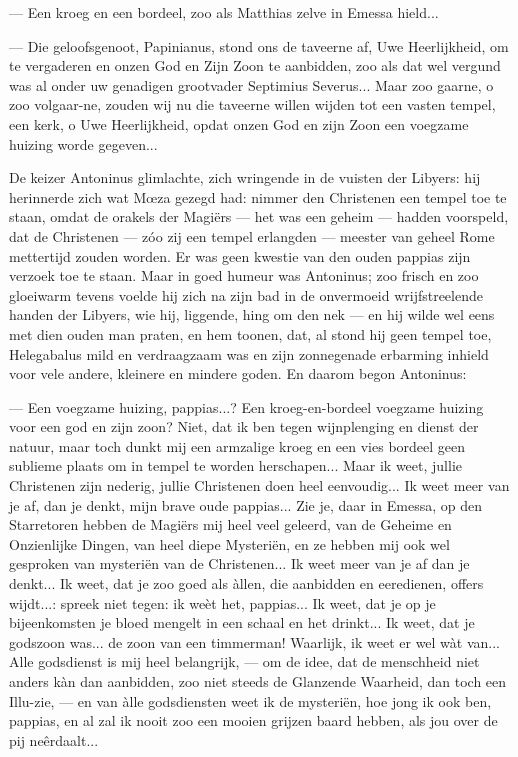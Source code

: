 \documentclass[a4paper, 12pt, oneside, dutch]{article}
\begin{document}
--- Een kroeg en een bordeel, zoo als Matthias zelve in Emessa hield...

--- Die geloofsgenoot, Papinianus, stond ons de taveerne af, Uwe Heerlijkheid, om te vergaderen en onzen God en Zijn Zoon te aanbidden, zoo als dat wel vergund was al onder uw genadigen grootvader Septimius Severus... Maar zoo gaarne, o zoo volgaar-ne, zouden wij nu die taveerne willen wijden tot een vasten tempel, een kerk, o Uwe Heerlijkheid, opdat onzen God en zijn Zoon een voegzame huizing worde gegeven...

De keizer Antoninus glimlachte, zich wringende in de vuisten der Libyers: hij herinnerde zich wat Mœza gezegd had: nimmer den Christenen een tempel toe te staan, omdat de orakels der Magiërs --- het was een geheim --- hadden voorspeld, dat de Christenen --- zóo zij een tempel erlangden --- meester van geheel Rome mettertijd zouden worden. Er was geen kwestie van den ouden pappias zijn verzoek toe te staan. Maar in goed humeur was Antoninus; zoo frisch en zoo gloeiwarm tevens voelde hij zich na zijn bad in de onvermoeid wrijfstreelende handen der Libyers, wie hij, liggende, hing om den nek --- en hij wilde wel eens met dien ouden man praten, en hem toonen, dat, al stond hij geen tempel toe, Helegabalus mild en verdraagzaam was en zijn zonnegenade erbarming inhield voor vele andere, kleinere en mindere goden. En daarom begon Antoninus:

--- Een voegzame huizing, pappias...? Een kroeg-en-bordeel voegzame huizing voor een god en zijn zoon? Niet, dat ik ben tegen wijnplenging en dienst der natuur, maar toch dunkt mij een armzalige kroeg en een vies bordeel geen sublieme plaats om in tempel te worden herschapen... Maar ik weet, jullie Christenen zijn nederig, jullie Christenen doen heel eenvoudig... Ik weet meer van je af, dan je denkt, mijn brave oude pappias... Zie je, daar in Emessa, op den Starretoren hebben de Magiërs mij heel veel geleerd, van de Geheime en Onzienlijke Dingen, van heel diepe Mysteriën, en ze hebben mij ook wel gesproken van mysteriën van de Christenen... Ik weet meer van je af dan je denkt... Ik weet, dat je zoo goed als àllen, die aanbidden en eeredienen, offers wijdt...: spreek niet tegen: ik weèt het, pappias... Ik weet, dat je op je bijeenkomsten je bloed mengelt in een schaal en het drinkt... Ik weet, dat je godszoon was... de zoon van een timmerman! Waarlijk, ik weet er wel wàt van... Alle godsdienst is mij heel belangrijk, --- om de idee, dat de menschheid niet anders kàn dan aanbidden, zoo niet steeds de Glanzende Waarheid, dan toch een Illu-zie, --- en van àlle godsdiensten weet ik de mysteriën, hoe jong ik ook ben, pappias, en al zal ik nooit zoo een mooien grijzen baard hebben, als jou over de pij neêrdaalt...
\end{document}
